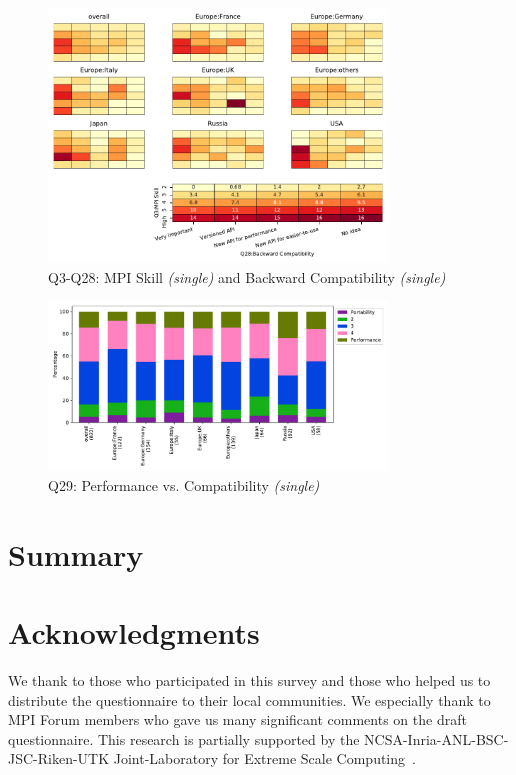 \documentclass[conference,10pt,letterpaper]{IEEEtran}
\begin{document}
\begin{figure}[htb]
\begin{center}
\includegraphics[width=9cm]{Figs/Q3-Q28.pdf}
\caption{Q3-Q28: MPI Skill {\it(single)} and Backward Compatibility {\it(single)}}
\label{fig:skill-and-compatibility}
\end{center}
\end{figure}

\begin{figure}[htb]
\begin{center}
\includegraphics[width=9cm]{Figs/Q29.pdf}
\caption{Q29: Performance vs. Compatibility {\it(single)}}
\label{fig:performance-vs-compatibility}
\end{center}
\end{figure}

\section{Summary}

\section*{Acknowledgments}
We thank to those who participated in this survey and those who
helped us to distribute the questionnaire to their local
communities. We especially thank to MPI Forum members who gave us many
significant comments on the draft questionnaire.
This research is partially supported by the
NCSA-Inria-ANL-BSC-JSC-Riken-UTK Joint-Laboratory for Extreme Scale
Computing~\cite{JLESC}.



\end{document}

